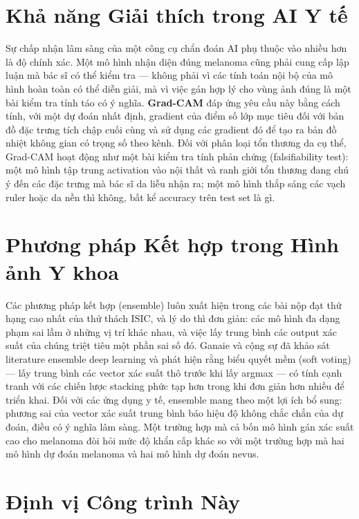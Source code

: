 \section{Khả năng Giải thích trong AI Y tế}

Sự chấp nhận lâm sàng của một công cụ chẩn đoán AI phụ thuộc vào nhiều hơn là độ chính xác. Một mô hình nhận diện đúng melanoma cũng phải cung cấp lập luận mà bác sĩ có thể kiểm tra --- không phải vì các tính toán nội bộ của mô hình hoàn toàn có thể diễn giải, mà vì việc gán hợp lý cho vùng ảnh đúng là một bài kiểm tra tỉnh táo có ý nghĩa. \textbf{Grad-CAM} đáp ứng yêu cầu này bằng cách tính, với một dự đoán nhất định, gradient của điểm số lớp mục tiêu đối với bản đồ đặc trưng tích chập cuối cùng và sử dụng các gradient đó để tạo ra bản đồ nhiệt không gian có trọng số theo kênh. Đối với phân loại tổn thương da cụ thể, Grad-CAM hoạt động như một bài kiểm tra tính phản chứng (falsifiability test): một mô hình tập trung activation vào nội thất và ranh giới tổn thương đang chú ý đến các đặc trưng mà bác sĩ da liễu nhận ra; một mô hình thắp sáng các vạch ruler hoặc da nền thì không, bất kể accuracy trên test set là gì.

\section{Phương pháp Kết hợp trong Hình ảnh Y khoa}

Các phương pháp kết hợp (ensemble) luôn xuất hiện trong các bài nộp đạt thứ hạng cao nhất của thử thách ISIC, và lý do thì đơn giản: các mô hình đa dạng phạm sai lầm ở những vị trí khác nhau, và việc lấy trung bình các output xác suất của chúng triệt tiêu một phần sai số đó. Ganaie và cộng sự đã khảo sát literature ensemble deep learning và phát hiện rằng biểu quyết mềm (soft voting) --- lấy trung bình các vector xác suất thô trước khi lấy argmax --- có tính cạnh tranh với các chiến lược stacking phức tạp hơn trong khi đơn giản hơn nhiều để triển khai. Đối với các ứng dụng y tế, ensemble mang theo một lợi ích bổ sung: phương sai của vector xác suất trung bình báo hiệu độ không chắc chắn của dự đoán, điều có ý nghĩa lâm sàng. Một trường hợp mà cả bốn mô hình gán xác suất cao cho melanoma đòi hỏi mức độ khẩn cấp khác so với một trường hợp mà hai mô hình dự đoán melanoma và hai mô hình dự đoán nevus.

\section{Định vị Công trình Này}

